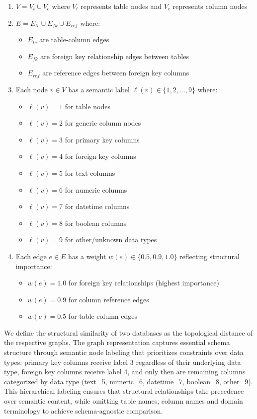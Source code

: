 \begin{enumerate}
    \item $V = V_t \cup V_c$ where $V_t$ represents table nodes and $V_c$ represents column nodes
    \item $E = E_{tc} \cup E_{fk} \cup E_{ref}$ where:
        \begin{itemize}
            \item $E_{tc}$ are table-column edges
            \item $E_{fk}$ are foreign key relationship edges between tables
            \item $E_{ref}$ are reference edges between foreign key columns
        \end{itemize}
    \item Each node $v \in V$ has a semantic label $\ell(v) \in \{1, 2, \ldots, 9\}$ where:
        \begin{itemize}
            \item $\ell(v) = 1$ for table nodes
            \item $\ell(v) = 2$ for generic column nodes
            \item $\ell(v) = 3$ for primary key columns
            \item $\ell(v) = 4$ for foreign key columns
            \item $\ell(v) = 5$ for text columns
            \item $\ell(v) = 6$ for numeric columns
            \item $\ell(v) = 7$ for datetime columns
            \item $\ell(v) = 8$ for boolean columns
            \item $\ell(v) = 9$ for other/unknown data types
        \end{itemize}
    \item Each edge $e \in E$ has a weight $w(e) \in \{0.5, 0.9, 1.0\}$ reflecting structural importance:
        \begin{itemize}
            \item $w(e) = 1.0$ for foreign key relationships (highest importance)
            \item $w(e) = 0.9$ for column reference edges
            \item $w(e) = 0.5$ for table-column edges
        \end{itemize}
\end{enumerate}

We define the structural similarity of two databases as the topological distance
of the respective graphs. The graph representation captures essential schema
structure through semantic node labeling that prioritizes constraints over data
types: primary key columns receive label 3 regardless of their underlying data
type, foreign key columns receive label 4, and only then are remaining columns
categorized by data type (text=5, numeric=6, datetime=7, boolean=8, other=9).
This hierarchical labeling ensures that structural relationships take
precedence over semantic content, while omitting table names, column names and
domain terminology to achieve schema-agnostic comparison.


